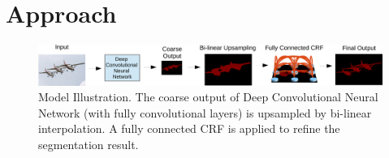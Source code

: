 \section{Approach}

\begin{figure}
  \centering
  \includegraphics[width=1\linewidth]{fig/model_illustration.pdf}
  \caption{Model Illustration. The coarse output of Deep Convolutional Neural Network (with fully convolutional layers) is upsampled by bi-linear interpolation. A fully connected CRF is applied to refine the segmentation result.}
  \label{fig:ModelIllustration}
\end{figure}




 

